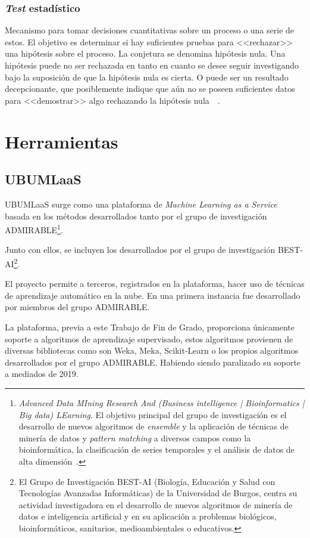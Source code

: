 \subsubsection{\textit{Test} estadístico}
Mecanismo para tomar decisiones cuantitativas sobre un proceso o una serie de estos. El objetivo es determinar si hay suficientes pruebas para <<rechazar>> una hipótesis sobre el proceso. La conjetura se denomina hipótesis nula. Una hipótesis puede no ser rechazada en tanto en cuanto se desee seguir investigando bajo la suposición de que la hipótesis nula es cierta. O puede ser un resultado decepcionante, que posiblemente indique que aún no se poseen suficientes datos para <<demostrar>> algo rechazando la hipótesis nula~\cite{lucon2018new}~\cite{nist}.

\section{Herramientas}\label{sec:herramientas}
\subsection{UBUMLaaS}\label{UBUMLaaS}
UBUMLaaS surge como una plataforma de \textit{Machine Learning as a Service} basada en los métodos desarrollados tanto por el grupo de investigación ADMIRABLE\footnote{\textit{Advanced Data MIning Research And (Business intelligence | Bioinformatics | Big data) LEarning}.  El objetivo principal del grupo de investigación es el desarrollo de nuevos algoritmos de \textit{ensemble} y la aplicación de técnicas de minería de datos y \textit{pattern matching} a diversos campos como la bioinformática, la clasificación de series temporales y el análisis de datos de alta dimensión~\cite{admirable_intro}.}.

Junto con ellos, se incluyen los desarrollados por el grupo de investigación BEST-AI\footnote{El Grupo de Investigación BEST-AI (Biología, Educación y Salud con Tecnologías Avanzadas Informáticas) de la Universidad de Burgos, centra su actividad investigadora en el desarrollo de nuevos algoritmos de minería de datos e inteligencia artificial y en su aplicación a problemas biológicos, bioinformáticos, sanitarios, medioambientales o educativos.}.

El proyecto permite a terceros, registrados en la plataforma, hacer uso de técnicas de aprendizaje automático en la nube. En una primera instancia fue desarrollado por miembros del grupo ADMIRABLE.

La plataforma, previa a este Trabajo de Fin de Grado, proporciona únicamente soporte a algoritmos de aprendizaje supervisado, estos algoritmos provienen de diversas bibliotecas como son Weka, Meka, Scikit-Learn o los propios algoritmos desarrollados por el grupo ADMIRABLE. Habiendo siendo paralizado su soporte a mediados de 2019.

